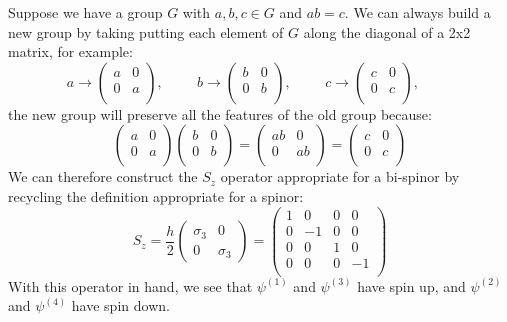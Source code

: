 \documentclass[12pt]{book}
\begin{document}
Suppose we have a group $G$ with $a,b,c \in G$ and $ab = c$.  We can always build a new group by taking putting each element of $G$ along the diagonal of a 2x2 matrix, for example:
$$a \to \begin{pmatrix} a & 0 \\ 0 & a \\ \end{pmatrix}, \hspace{1cm}
b \to \begin{pmatrix} b & 0 \\ 0 & b \\ \end{pmatrix}, \hspace{1cm}
c \to \begin{pmatrix} c & 0 \\ 0 & c \\ \end{pmatrix}, \hspace{1cm}
$$
the new group will preserve all the features of the old group because:
$$\begin{pmatrix} a & 0 \\ 0 & a \\ \end{pmatrix}
\begin{pmatrix} b & 0 \\ 0 & b \\ \end{pmatrix}
= \begin{pmatrix} ab & 0 \\ 0 & ab \\ \end{pmatrix} = 
\begin{pmatrix} c & 0 \\ 0 & c \\ \end{pmatrix}$$
We can therefore construct the $S_z$ operator appropriate for a bi-spinor by recycling the definition appropriate for a spinor:
$$S_z = \frac{h}{2} \begin{pmatrix} \sigma_3 & 0 \\ 0 & \sigma_3 \end{pmatrix}
= \begin{pmatrix} 
1 & 0 & 0 & 0 \\ 
0 &-1 & 0 & 0 \\ 
0 & 0 & 1 & 0 \\ 
0 & 0 & 0 &-1 \\ 
\end{pmatrix}
$$
With this operator in hand, we see that $\psi^{(1)}$ and $\psi^{(3)}$ have spin up, and 
$\psi^{(2)}$ and $\psi^{(4)}$ have spin down.
\end{document}
